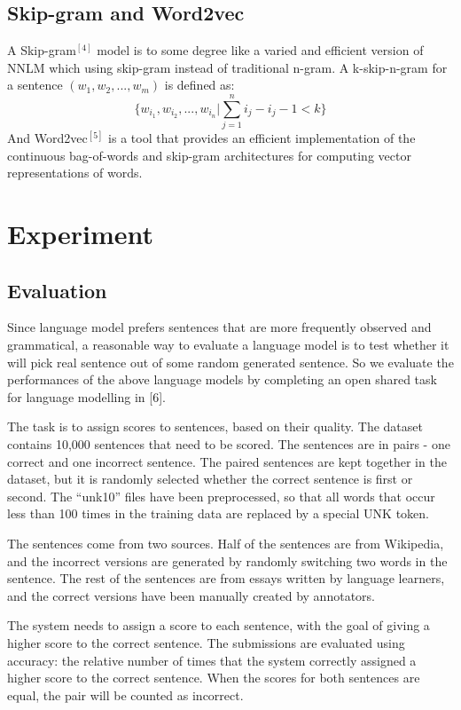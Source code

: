 \documentclass[11pt, oneside]{article}   	%
\begin{document}
\subsection{Skip-gram and Word2vec}
A Skip-gram$^{[4]}$ model is to some degree like a varied and efficient version of NNLM which using skip-gram instead of traditional n-gram. A k-skip-n-gram for a sentence  $(w_1,w_2,...,w_m)$ is defined as:
\[
\{w_{i_1},w_{i_2},...,w_{i_n}|\sum_{j=1}^{n}{i_j-i_j-1} <k\}
\]
And Word2vec$^{[5]}$ is a tool that provides an efficient implementation of the continuous bag-of-words and skip-gram architectures for computing vector representations of words.
\section{Experiment}
\subsection{Evaluation}
Since language model prefers sentences that are more frequently observed and grammatical, a reasonable way to evaluate a language model is to test whether it will pick real sentence out of some random generated sentence. So we evaluate the performances of the above language models by completing an open shared task for language modelling in [6].

The task is to assign scores to sentences, based on their quality. The dataset contains 10,000 sentences that need to be scored. The sentences are in pairs - one correct and one incorrect sentence. The paired sentences are kept together in the dataset, but it is randomly selected whether the correct sentence is first or second. The ``unk10'' files have been preprocessed, so that all words that occur less than 100 times in the training data are replaced by a special UNK token. 

The sentences come from two sources. Half of the sentences are from Wikipedia, and the incorrect versions are generated by randomly switching two words in the sentence. The rest of the sentences are from essays written by language learners, and the correct versions have been manually created by annotators.

The system needs to assign a score to each sentence, with the goal of giving a higher score to the correct sentence. The submissions are evaluated using accuracy: the relative number of times that the system correctly assigned a higher score to the correct sentence. When the scores for both sentences are equal, the pair will be counted as incorrect. 
\end{document}
